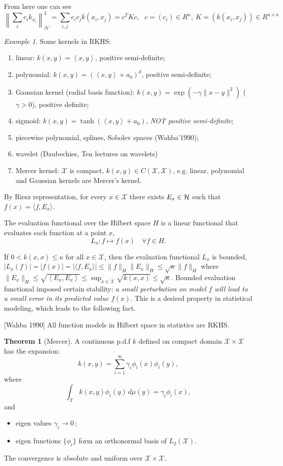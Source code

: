 \documentclass[twoside]{article}
\theoremstyle{definition}
\newtheorem{thm}{Theorem}[section]
\theoremstyle{definition}
\theoremstyle{remark}
\newtheorem*{example}{Example}
\def\X{{\mathcal X}}
\def\H{{\cal{H}}}
\begin{document}
From here one can see
\[ \left \| \sum_i c_i k_{x_i}\right \|^2_{\mathcal H} = \sum_{i,j} c_i c_j k(x_i,x_j)  = c^T K c, \ \ \ c=(c_i)\in R^n,\ K=(k(x_i,x_j))\in R^{n\times n} \]

\begin{example} Some kernels in RKHS:
\begin{enumerate}
\item linear: $k(x,y)=\left< x,y\right>$, positive semi-definite;
\item polynomial: $k(x,y) = (\left<x,y\right>+ a_0)^d$, positive semi-definite;
\item Gaussian kernel (radial basis function): $k(x,y)=\exp(-\gamma \|x-y\|^2)$ ($\gamma>0$), positive definite;
\item sigmoid: $k(x,y)=\tanh(\left<x,y\right> +a_0)$, \emph{NOT positive semi-definite};
\item piecewise polynomial, splines, Sobolev spaces (Wahba'1990); 
\item wavelet (Daubechies, Ten lectures on wavelets)
\item Mercer kernel: $\mathcal{X}$ is compact, $k(x,y)\in C(\mathcal{X},\mathcal{X})$, e.g. linear, polynomial and Gaussian kernels are Mercer's kernel.
\end{enumerate}
\end{example}

By Riesz representation, for every $x\in \X$ there exists $E_x \in \H$ such that $f(x) = \langle f, E_x\rangle$.

The evaluation functional over the Hilbert space $H$ is a linear functional that evaluates each function at a point $x$, 
$$ L_x : f \mapsto f(x) \quad \forall f\in H.$$

If $0<k(x,x)\leq \kappa$ for all $x\in \X$, then the evaluation functional $L_x$ is bounded, $|L_x(f)| = |f(x)| = |\langle f,E_x \rangle| \le \|f\|_H\|E_x\|_H\leq \sqrt{\kappa} \|f\|_H$ where $\|E_x\|_H \le \sqrt{\left< E_x, E_x\right>} \leq \sup_{x\in \X} \sqrt{k(x,x)}\leq \sqrt{\kappa}$. Bounded evaluation functional imposed certain stability: \emph{a small perturbation on model $f$ will lead to a small error in its predicted value $f(x)$}. This is a desired property in statistical modeling, which leads to the following fact.  

[Wahba 1990] All function models in Hilbert space in statistics are RKHS. 


\begin{thm}[Mercer]
A continuous p.d.f $k$ defined on compact domain $\mathcal{X} \times \mathcal{X} $ has the expansion: 
$$k(x,y) = \sum\limits_{i = 1} ^\infty \gamma_i \phi_i(x) \phi_i(y) ,$$ 
where 
$$\int_\mathcal{X} k(x,y)\phi_i(y)\, \textit{d}\mu(y) = \gamma_i \phi_i(x) ,$$
and 
\begin{itemize}
  \item eigen values $\gamma_i \to 0 \,$;  
  \item eigen functions $\{\phi_i\}$ form an orthonormal basis of $L_2(\mathcal{X})$. 
\end{itemize}
The convergence is absolute and uniform over $\mathcal{X}\times \mathcal{X}$.
\end{thm}
\end{document}
